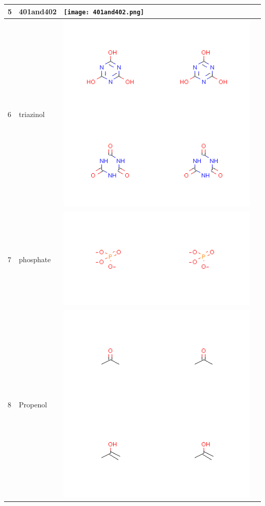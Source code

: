 \begin{longtable}{|l|l|l|l|}
\hline
5 & 401and402 & \texttt{[image: 401and402.png]} & \\
\hline
6 & triazinol & \includegraphics[scale=0.6]{triazinol.png} & \\
\hline
7 & phosphate & \includegraphics[scale=0.6]{phosphate.png} & \\
\hline
8 & Propenol & \includegraphics[scale=0.6]{Propenol.png} & \\

\end{longtable}
